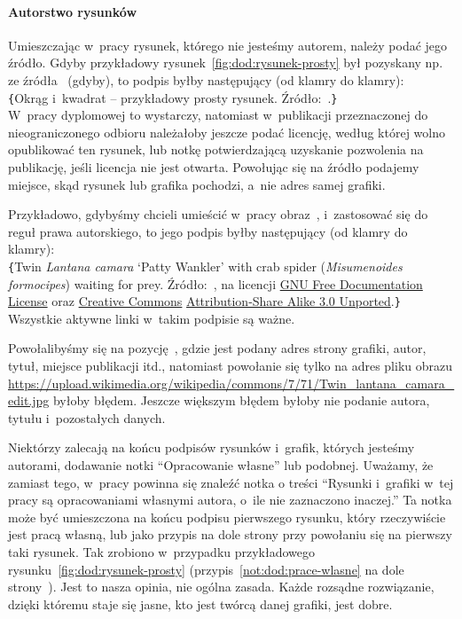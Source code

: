 \paragraph{Autorstwo rysunków}
\label{sec:dod:rysunekautorstwo}
Umieszczając w~pracy rysunek, którego nie jesteśmy autorem, należy podać jego źródło. Gdyby przykładowy rysunek~\ref{fig:dod:rysunek-prosty} był pozyskany np. ze źródła~ (gdyby), to podpis byłby następujący (od klamry do klamry):\\[1ex]
{\tt \{}Okrąg i~kwadrat -- przykładowy prosty rysunek. Źródło:~.{\tt \}}\\[1ex]
W~pracy dyplomowej to wystarczy, natomiast w~publikacji przeznaczonej do nieograniczonego odbioru należałoby jeszcze podać licencję, według której wolno opublikować ten rysunek, lub notkę potwierdzającą uzyskanie pozwolenia na publikację, jeśli licencja nie jest otwarta. Powołując się na źródło podajemy miejsce, skąd rysunek lub grafika pochodzi, a~nie adres samej grafiki.

Przykładowo, gdybyśmy chcieli umieścić w~pracy obraz~, i~zastosować się do reguł prawa autorskiego, to jego podpis byłby następujący (od klamry do klamry):\\[1ex]
{\tt \{}Twin {\em {L}antana camara} `{P}atty {W}ankler' with crab spider ({\em {M}isumenoides formocipes}) waiting for prey. Źródło:~, na licencji \href{https://commons.wikimedia.org/wiki/Commons:GNU_Free_Documentation_License,_version_1.2}{GNU Free Documentation License} oraz \href{https://en.wikipedia.org/wiki/Creative_Commons_license}{Creative Commons} \href{https://creativecommons.org/licenses/by-sa/3.0/deed.en}{Attribution-Share Alike 3.0 Unported}.{\tt \}}\\[1ex]
Wszystkie aktywne linki w~takim podpisie są ważne. 

Powołalibyśmy się na pozycję~, gdzie jest podany adres strony grafiki, autor, tytuł, miejsce publikacji itd., natomiast powołanie się tylko na adres pliku obrazu \url{https://upload.wikimedia.org/wikipedia/commons/7/71/Twin_lantana_camara_edit.jpg} byłoby błędem. Jeszcze większym błędem byłoby nie podanie autora, tytułu i~pozostałych danych.

Niektórzy zalecają na końcu podpisów rysunków i~grafik, których jesteśmy autorami, dodawanie notki ``Opracowanie własne'' lub podobnej. Uważamy, że zamiast tego, w~pracy powinna się znaleźć notka o treści ``Rysunki i~grafiki w~tej pracy są opracowaniami własnymi autora, o~ile nie zaznaczono inaczej.'' Ta notka może być umieszczona na końcu podpisu pierwszego rysunku, który rzeczywiście jest pracą własną, lub jako przypis na dole strony przy powołaniu się na pierwszy taki rysunek. Tak zrobiono w~przypadku przykładowego rysunku~\ref{fig:dod:rysunek-prosty} (przypis~\ref{not:dod:prace-wlasne} na dole strony~\pageref{not:dod:prace-wlasne}). Jest to nasza opinia, nie ogólna zasada. Każde rozsądne rozwiązanie, dzięki któremu staje się jasne, kto jest twórcą danej grafiki, jest dobre.

